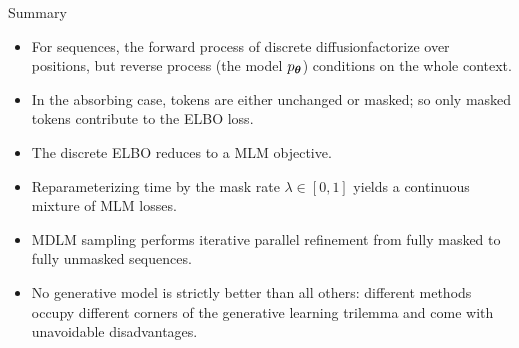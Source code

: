 \documentclass{beamer}
\begin{document}
\begin{frame}{Summary}
	\begin{itemize}
		\item For sequences, the forward process of discrete diffusionfactorize over positions, but
		reverse process (the model $p_{\boldsymbol{\theta}}$) conditions on the whole context.
		\vfill
		\item In the absorbing case, tokens are either unchanged or masked; so only masked tokens contribute to the ELBO loss.
		\vfill
		\item The discrete ELBO reduces to a MLM objective.
		\vfill
		\item Reparameterizing time by the mask rate $\lambda\in[0,1]$ yields a continuous mixture of MLM losses.
		\vfill
		\item MDLM sampling performs iterative parallel refinement from fully masked to fully unmasked sequences.
		\vfill
		\item No generative model is strictly better than all others: different methods occupy different corners of the generative learning trilemma and come with unavoidable disadvantages.
	\end{itemize}
\end{frame}
\end{document}
